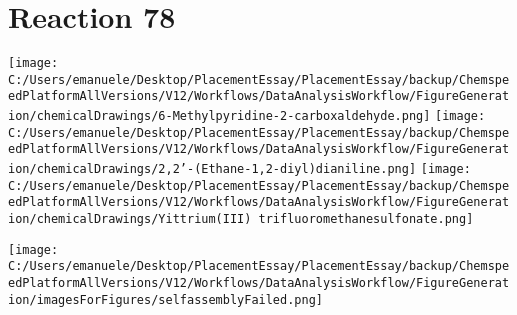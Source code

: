 \documentclass{article}%
\begin{document}
\section*{Reaction 78}%
%
\begin{scheme}[H]%
\begin{minipage}{0.5\textwidth}%
\texttt{[image: C:/Users/emanuele/Desktop/PlacementEssay/PlacementEssay/backup/ChemspeedPlatformAllVersions/V12/Workflows/DataAnalysisWorkflow/FigureGeneration/chemicalDrawings/6-Methylpyridine-2-carboxaldehyde.png]}%
\texttt{[image: C:/Users/emanuele/Desktop/PlacementEssay/PlacementEssay/backup/ChemspeedPlatformAllVersions/V12/Workflows/DataAnalysisWorkflow/FigureGeneration/chemicalDrawings/2,2'-(Ethane-1,2-diyl)dianiline.png]}%
\texttt{[image: C:/Users/emanuele/Desktop/PlacementEssay/PlacementEssay/backup/ChemspeedPlatformAllVersions/V12/Workflows/DataAnalysisWorkflow/FigureGeneration/chemicalDrawings/Yittrium(III) trifluoromethanesulfonate.png]}%
\end{minipage}%
\begin{minipage}{0.5\textwidth}%
\begin{center}%
\texttt{[image: C:/Users/emanuele/Desktop/PlacementEssay/PlacementEssay/backup/ChemspeedPlatformAllVersions/V12/Workflows/DataAnalysisWorkflow/FigureGeneration/imagesForFigures/selfassemblyFailed.png]}%
\end{center}%
\end{minipage}%
\caption{Self-assembly of components 8, 20, with Yittrium(III) in a 3.0:1.5:1.0 molar ratio in CH$_3$CN at 60\textdegree C for 40h. These are the reagents (starting materials) for reaction 78.}%
\end{scheme}%
\end{document}

